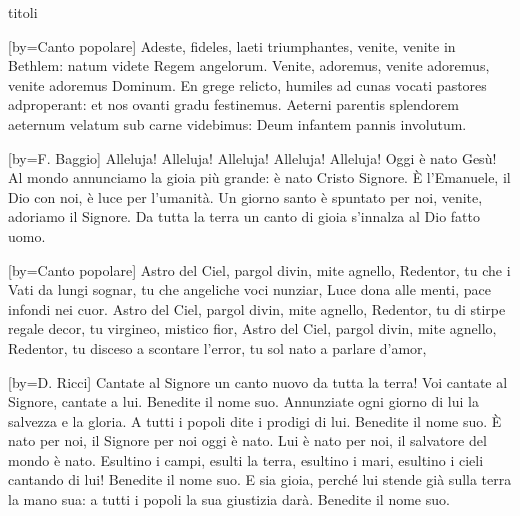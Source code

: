 \begin{songs}{titoli}

[by={Canto popolare}]
\beginverse
Adeste, fideles, laeti triumphantes,
venite, venite in Bethlem:
natum videte Regem angelorum.
\endverse
\beginchorus
Venite, adoremus, venite adoremus,
venite adoremus Dominum.
\endchorus
\beginverse
En grege relicto, humiles ad cunas
vocati pastores adproperant:
et nos ovanti gradu festinemus.
\endverse
\beginverse
Aeterni parentis splendorem aeternum
velatum sub carne videbimus:
Deum infantem pannis involutum.
\endverse
\endsong

[by={F. Baggio}]
\beginchorus
Alleluja! Alleluja! Alleluja!
Alleluja! Alleluja! Oggi è nato Gesù!
\endchorus
\beginverse
Al mondo annunciamo la gioia più grande: è nato Cristo Signore.
È l'Emanuele, il Dio con noi, è luce per l'umanità.
\endverse
\beginverse
Un giorno santo è spuntato per noi, venite, adoriamo il Signore.
Da tutta la terra un canto di gioia s'innalza al Dio fatto uomo.
\endverse
\endsong

[by={Canto popolare}]
\beginverse
Astro del Ciel, pargol divin, mite agnello, Redentor,
tu che i Vati da lungi sognar, tu che angeliche voci nunziar,
\endverse
\beginchorus
Luce dona alle menti, pace infondi nei cuor. 
\endchorus
\beginverse
Astro del Ciel, pargol divin, mite agnello, Redentor,
tu di stirpe regale decor, tu virgineo, mistico fior,
\endverse
\beginverse
Astro del Ciel, pargol divin, mite agnello, Redentor,
tu disceso a scontare l'error, tu sol nato a parlare d'amor,
\endverse
\endsong

[by={D. Ricci}]
\beginverse
Cantate al Signore un canto nuovo da tutta la terra!
Voi cantate al Signore, cantate a lui. Benedite il nome suo.
Annunziate ogni giorno di lui la salvezza e la gloria.
A tutti i popoli dite i prodigi di lui. Benedite il nome suo.
\endverse
\beginchorus
È nato per noi, il Signore per noi oggi è nato.
Lui è nato per noi, il salvatore del mondo è nato.
\endchorus
\beginverse
Esultino i campi, esulti la terra, esultino i mari,
esultino i cieli cantando di lui! Benedite il nome suo.
E sia gioia, perché lui stende già sulla terra la mano sua:
a tutti i popoli la sua giustizia darà. Benedite il nome suo.
\endverse
\endsong


\end{songs}
